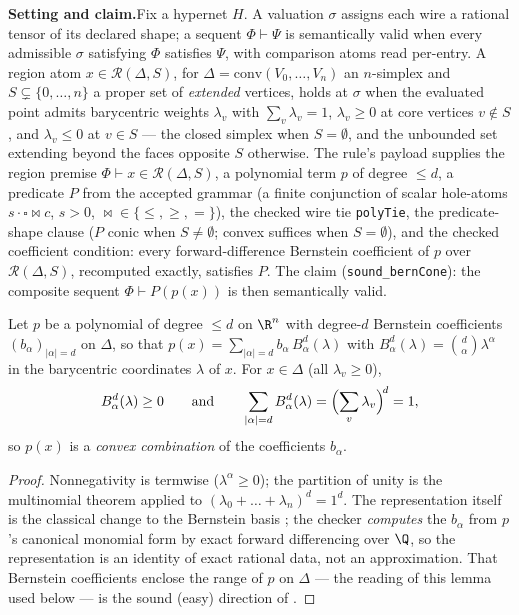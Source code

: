 

\textbf{Setting and claim.}\enspace Fix a hypernet $H$. A valuation
$\sigma$ assigns each wire a rational tensor of its declared shape; a
sequent $\Phi \vdash \Psi$ is semantically valid when every admissible
$\sigma$ satisfying $\Phi$ satisfies $\Psi$, with comparison atoms read
per-entry. A region atom $x \in \mathcal{R}(\Delta, S)$, for
$\Delta = \mathrm{conv}(V_0, \dots, V_n)$ an $n$-simplex and
$S \subsetneq \{0, \dots, n\}$ a proper set of \emph{extended} vertices,
holds at $\sigma$ when the evaluated point admits barycentric weights
$\lambda_v$ with $\sum_v \lambda_v = 1$, $\lambda_v \geq 0$ at core
vertices $v \notin S$, and $\lambda_v \leq 0$ at $v \in S$ --- the closed
simplex when $S = \emptyset$, and the unbounded set extending beyond the
faces opposite $S$ otherwise. The rule's payload supplies the region
premise $\Phi \vdash x \in \mathcal{R}(\Delta, S)$, a polynomial term $p$
of degree $\leq d$, a predicate $P$ from the accepted grammar (a finite
conjunction of scalar hole-atoms $s \cdot \square \bowtie c$, $s > 0$,
$\bowtie \in \{\leq, \geq, =\}$), the checked wire tie \texttt{polyTie},
the predicate-shape clause ($P$ conic when $S \neq \emptyset$; convex
suffices when $S = \emptyset$), and the checked coefficient condition:
every forward-difference Bernstein coefficient of $p$ over
$\mathcal{R}(\Delta, S)$, recomputed exactly, satisfies $P$. The claim
(\texttt{sound\_bernCone}): the composite sequent
$\Phi \vdash P(p(x))$ is then semantically valid.

\begin{blemma}\label{lem:bc-bern}
Let $p$ be a polynomial of degree $\leq d$ on $\R^n$ with degree-$d$
Bernstein coefficients $(b_\alpha)_{|\alpha| = d}$ on $\Delta$, so that
$p(x) = \sum_{|\alpha| = d} b_\alpha\, B^d_\alpha(\lambda)$ with
$B^d_\alpha(\lambda) = \binom{d}{\alpha} \lambda^\alpha$ in the
barycentric coordinates $\lambda$ of $x$. For $x \in \Delta$ (all
$\lambda_v \geq 0$),
\[
B^d_\alpha(\lambda) \geq 0
\qquad\text{and}\qquad
\sum_{|\alpha| = d} B^d_\alpha(\lambda)
  = \Bigl(\sum_v \lambda_v\Bigr)^{\!d} = 1,
\]
so $p(x)$ is a \emph{convex combination} of the coefficients $b_\alpha$.
\end{blemma}
\begin{proof}
Nonnegativity is termwise ($\lambda^\alpha \geq 0$); the partition of
unity is the multinomial theorem applied to
$(\lambda_0 + \dots + \lambda_n)^d = 1^d$. The representation itself is
the classical change to the Bernstein basis
\cite{bernstein1912,farouki2012}; the checker \emph{computes} the
$b_\alpha$ from $p$'s canonical monomial form by exact forward
differencing over $\Q$, so the representation is an identity of exact
rational data, not an approximation. That Bernstein coefficients
enclose the range of $p$ on $\Delta$ --- the reading of this lemma used
below --- is the sound (easy) direction of \cite{cargoshisha1966}.
\end{proof}

